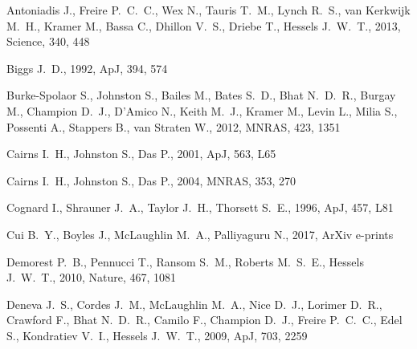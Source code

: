 \documentclass[fleqn,usenatbib]{mnras}
\begin{document}
\begin{thebibliography}{99}

{Antoniadis} J.,  {Freire} P.~C.~C., {Wex} N., {Tauris} T.~M., {Lynch} 
R.~S., {van Kerkwijk} M.~H., {Kramer} M., {Bassa} C., {Dhillon} V.~S., 
  {Driebe} T., {Hessels} J.~W.~T., 2013, Science, 340, 448

{Biggs} J.~D., 1992, ApJ, 394, 574

{Burke-Spolaor} S., {Johnston} S., {Bailes} M., {Bates} S.~D., {Bhat} 
  N.~D.~R., {Burgay} M., {Champion} D.~J., {D'Amico} N., {Keith} M.~J., 
  {Kramer} M., {Levin} L., {Milia} S., {Possenti} A., {Stappers} B., 
  {van Straten} W., 2012, MNRAS, 423, 1351

{Cairns} I.~H., {Johnston} S., {Das} P., 2001, ApJ, 563, L65

{Cairns} I.~H., {Johnston} S., {Das} P., 2004, MNRAS, 353, 270

{Cognard} I., {Shrauner} J.~A., {Taylor} J.~H., {Thorsett} S.~E., 1996, ApJ, 457, L81

{Cui} B.~Y., {Boyles} J., {McLaughlin} M.~A., {Palliyaguru} N., 2017, ArXiv e-prints

{Demorest} P.~B., {Pennucci} T., {Ransom} S.~M., {Roberts} M.~S.~E., 
  {Hessels} J.~W.~T., 2010, Nature, 467, 1081

{Deneva} J.~S., {Cordes} J.~M., {McLaughlin} M.~A., {Nice} D.~J., {Lorimer} 
  D.~R., {Crawford} F., {Bhat} N.~D.~R., {Camilo} F., {Champion} D.~J.,
  {Freire} P.~C.~C., {Edel} S., {Kondratiev} V.~I., {Hessels} J.~W.~T., 2009, ApJ, 703, 2259


\end{thebibliography}
\end{document}

